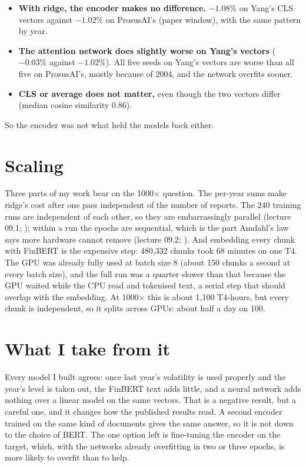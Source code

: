 \documentclass[11pt,a4paper]{article}
\begin{document}
\begin{itemize}
  \item \textbf{With ridge, the encoder makes no difference.} $-1.08\%$ on Yang's CLS vectors against $-1.02\%$ on
    ProsusAI's (paper window), with the same pattern by year.
  \item \textbf{The attention network does slightly worse on Yang's vectors} ($-0.03\%$ against $-1.02\%$). All five
    seeds on Yang's vectors are worse than all five on ProsusAI's, mostly because of 2004, and the network overfits
    sooner.
  \item \textbf{CLS or average does not matter,} even though the two vectors differ (median cosine similarity 0.86).
\end{itemize}

So the encoder was not what held the models back either.

\section{Scaling}

Three parts of my work bear on the 1000$\times$ question. The per-year sums make ridge's cost after one pass
independent of the number of reports. The 240 training runs are independent of each other, so they are
embarrassingly parallel (lecture 09.1; \citealp{dst091}); within a run the epochs are sequential, which is the part
Amdahl's law says more hardware cannot remove (lecture 09.2; \citealp{dst092}). And embedding every chunk with FinBERT
is the expensive step: 480,332 chunks took 68 minutes on one T4. The GPU was already fully used at batch size 8 (about
150 chunks a second at every batch size), and the full run was a quarter slower than that because the GPU waited while
the CPU read and tokenised text, a serial step that should overlap with the embedding. At 1000$\times$ this is about
1,100 T4-hours, but every chunk is independent, so it splits across GPUs: about half a day on 100.

\section{What I take from it}

Every model I built agrees: once last year's volatility is used properly and the year's level is taken out, the
FinBERT text adds little, and a neural network adds nothing over a linear model on the same vectors. That is a
negative result, but a careful one, and it changes how the published results read. A second encoder trained on the
same kind of documents gives the same answer, so it is not down to the choice of BERT. The one option left is
fine-tuning the encoder on the target, which, with the networks already overfitting in two or three epochs, is more
likely to overfit than to help.



\end{document}
